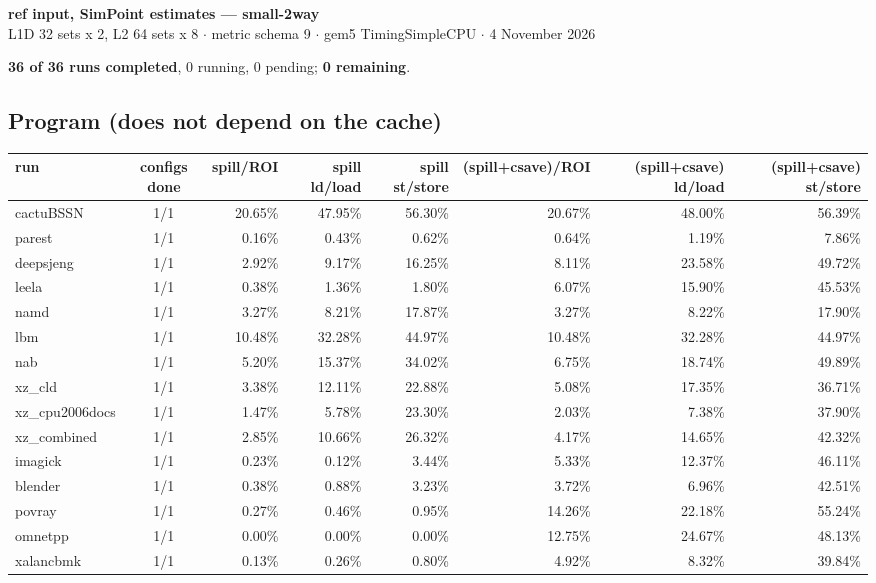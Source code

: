 \documentclass[10pt,a4paper,landscape]{article}
\begin{document}
\begin{center}
{\large\bfseries ref input, SimPoint estimates --- small-2way}\\[3pt]
{\small L1D 32 sets x 2, L2 64 sets x 8 $\cdot$ metric schema 9 $\cdot$ gem5 TimingSimpleCPU $\cdot$ 4 November 2026}
\end{center}
\textbf{36 of 36 runs completed}, 0 running, 0 pending; \textbf{0 remaining}.\par
\subsection*{Program (does not depend on the cache)}
{\footnotesize
\begin{longtable}{lcrrrrrr}
\toprule
run & configs done & spill/ROI & spill ld/load & spill st/store & (spill+csave)/ROI & (spill+csave) ld/load & (spill+csave) st/store \\
\midrule
\endhead
\bottomrule
\endfoot
cactuBSSN & 1/1 & 20.65\% & 47.95\% & 56.30\% & 20.67\% & 48.00\% & 56.39\% \\
parest & 1/1 & 0.16\% & 0.43\% & 0.62\% & 0.64\% & 1.19\% & 7.86\% \\
deepsjeng & 1/1 & 2.92\% & 9.17\% & 16.25\% & 8.11\% & 23.58\% & 49.72\% \\
leela & 1/1 & 0.38\% & 1.36\% & 1.80\% & 6.07\% & 15.90\% & 45.53\% \\
namd & 1/1 & 3.27\% & 8.21\% & 17.87\% & 3.27\% & 8.22\% & 17.90\% \\
lbm & 1/1 & 10.48\% & 32.28\% & 44.97\% & 10.48\% & 32.28\% & 44.97\% \\
nab & 1/1 & 5.20\% & 15.37\% & 34.02\% & 6.75\% & 18.74\% & 49.89\% \\
xz\_cld & 1/1 & 3.38\% & 12.11\% & 22.88\% & 5.08\% & 17.35\% & 36.71\% \\
xz\_cpu2006docs & 1/1 & 1.47\% & 5.78\% & 23.30\% & 2.03\% & 7.38\% & 37.90\% \\
xz\_combined & 1/1 & 2.85\% & 10.66\% & 26.32\% & 4.17\% & 14.65\% & 42.32\% \\
imagick & 1/1 & 0.23\% & 0.12\% & 3.44\% & 5.33\% & 12.37\% & 46.11\% \\
blender & 1/1 & 0.38\% & 0.88\% & 3.23\% & 3.72\% & 6.96\% & 42.51\% \\
povray & 1/1 & 0.27\% & 0.46\% & 0.95\% & 14.26\% & 22.18\% & 55.24\% \\
omnetpp & 1/1 & 0.00\% & 0.00\% & 0.00\% & 12.75\% & 24.67\% & 48.13\% \\
xalancbmk & 1/1 & 0.13\% & 0.26\% & 0.80\% & 4.92\% & 8.32\% & 39.84\% \\

\end{longtable}}
\end{document}
